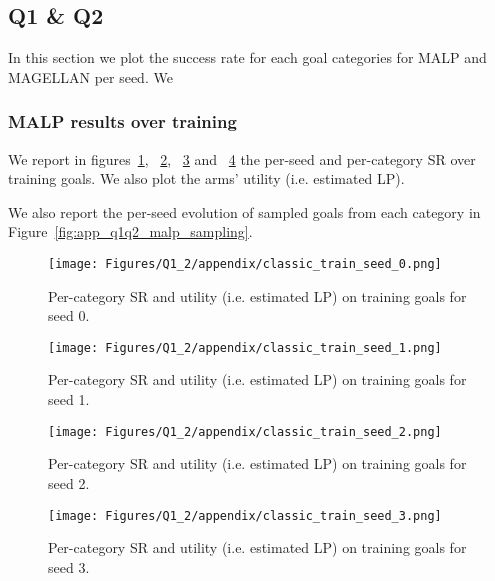 \subsection{\textbf{Q1} \& \textbf{Q2}} \label{app:additional_results_q1q2}

In this section we plot the success rate for each goal categories for MALP and MAGELLAN per seed. We 

\subsubsection{MALP results over training}
\label{app:additional_results_q1q2_MALP}
We report in figures~\ref{fig:app_q1q2_classic_seed0}, ~\ref{fig:app_q1q2_classic_seed1}, ~\ref{fig:app_q1q2_classic_seed2} and ~\ref{fig:app_q1q2_classic_seed3} the per-seed and per-category SR over training goals. We also plot the arms' utility (i.e. estimated LP).

We also report the per-seed evolution of sampled goals from each category in Figure~\ref{fig:app_q1q2_malp_sampling}.

\begin{figure}[!ht]
    \centering
    \texttt{[image: Figures/Q1\_2/appendix/classic\_train\_seed\_0.png]}
    \caption{Per-category SR and utility (i.e. estimated LP) on training goals for seed 0.}
    \label{fig:app_q1q2_classic_seed0}
\end{figure}

\begin{figure}[!ht]
    \centering
    \texttt{[image: Figures/Q1\_2/appendix/classic\_train\_seed\_1.png]}
    \caption{Per-category SR and utility (i.e. estimated LP) on training goals for seed 1.}
    \label{fig:app_q1q2_classic_seed1}
\end{figure}

\begin{figure}[!ht]
    \centering
    \texttt{[image: Figures/Q1\_2/appendix/classic\_train\_seed\_2.png]}
    \caption{Per-category SR and utility (i.e. estimated LP) on training goals for seed 2.}
    \label{fig:app_q1q2_classic_seed2}
\end{figure}

\begin{figure}[!ht]
    \centering
    \texttt{[image: Figures/Q1\_2/appendix/classic\_train\_seed\_3.png]}
    \caption{Per-category SR and utility (i.e. estimated LP) on training goals for seed 3.}
    \label{fig:app_q1q2_classic_seed3}
\end{figure}

